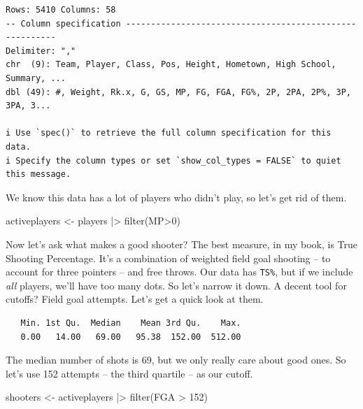 \documentclass[
  letterpaper,
  DIV=11,
  numbers=noendperiod]{scrreprt}
\newenvironment{Shaded}{\begin{snugshade}}{\end{snugshade}}
\newcommand{\DecValTok}[1]{\textcolor[rgb]{0.68,0.00,0.00}{#1}}
\newcommand{\FunctionTok}[1]{\textcolor[rgb]{0.28,0.35,0.67}{#1}}
\newcommand{\NormalTok}[1]{\textcolor[rgb]{0.00,0.23,0.31}{#1}}
\newcommand{\OtherTok}[1]{\textcolor[rgb]{0.00,0.23,0.31}{#1}}
\newcommand{\SpecialCharTok}[1]{\textcolor[rgb]{0.37,0.37,0.37}{#1}}
\begin{document}
\begin{verbatim}
Rows: 5410 Columns: 58
-- Column specification --------------------------------------------------------
Delimiter: ","
chr  (9): Team, Player, Class, Pos, Height, Hometown, High School, Summary, ...
dbl (49): #, Weight, Rk.x, G, GS, MP, FG, FGA, FG%, 2P, 2PA, 2P%, 3P, 3PA, 3...

i Use `spec()` to retrieve the full column specification for this data.
i Specify the column types or set `show_col_types = FALSE` to quiet this message.
\end{verbatim}

We know this data has a lot of players who didn't play, so let's get rid
of them.

\begin{Shaded}
\begin{Highlighting}[]
\NormalTok{activeplayers }\OtherTok{\textless{}{-}}\NormalTok{ players }\SpecialCharTok{|\textgreater{}} \FunctionTok{filter}\NormalTok{(MP}\SpecialCharTok{\textgreater{}}\DecValTok{0}\NormalTok{) }
\end{Highlighting}
\end{Shaded}

Now let's ask what makes a good shooter? The best measure, in my book,
is True Shooting Percentage. It's a combination of weighted field goal
shooting -- to account for three pointers -- and free throws. Our data
has \texttt{TS\%}, but if we include \emph{all} players, we'll have too
many dots. So let's narrow it down. A decent tool for cutoffs? Field
goal attempts. Let's get a quick look at them.

\begin{Shaded}
\end{Shaded}

\begin{verbatim}
   Min. 1st Qu.  Median    Mean 3rd Qu.    Max. 
   0.00   14.00   69.00   95.38  152.00  512.00 
\end{verbatim}

The median number of shots is 69, but we only really care about good
ones. So let's use 152 attempts -- the third quartile -- as our cutoff.

\begin{Shaded}
\begin{Highlighting}[]
\NormalTok{shooters }\OtherTok{\textless{}{-}}\NormalTok{ activeplayers }\SpecialCharTok{|\textgreater{}} \FunctionTok{filter}\NormalTok{(FGA }\SpecialCharTok{\textgreater{}} \DecValTok{152}\NormalTok{)}
\end{Highlighting}
\end{Shaded}
\end{document}
